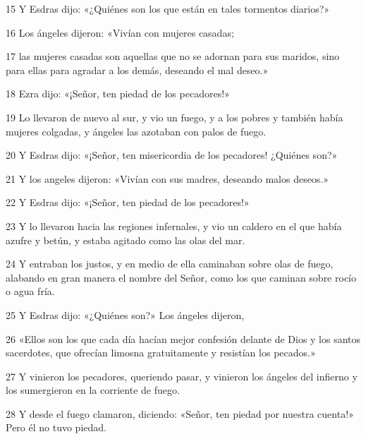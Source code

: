 \par 15 Y Esdras dijo: «¿Quiénes son los que están en tales tormentos diarios?»

\par 16 Los ángeles dijeron: «Vivían con mujeres casadas;

\par 17 las mujeres casadas son aquellas que no se adornan para sus maridos, sino para ellas para agradar a los demás, deseando el mal deseo.»

\par 18 Ezra dijo: «¡Señor, ten piedad de los pecadores!»

\par 19 Lo llevaron de nuevo al sur, y vio un fuego, y a los pobres y también había mujeres colgadas, y ángeles las azotaban con palos de fuego.

\par 20 Y Esdras dijo: «¡Señor, ten misericordia de los pecadores! ¿Quiénes son?»

\par 21 Y los angeles dijeron: «Vivían con sus madres, deseando malos deseos.»

\par 22 Y Esdras dijo: «¡Señor, ten piedad de los pecadores!»

\par 23 Y lo llevaron hacia las regiones infernales, y vio un caldero en el que había azufre y betún, y estaba agitado como las olas del mar.

\par 24 Y entraban los justos, y en medio de ella caminaban sobre olas de fuego, alabando en gran manera el nombre del Señor, como los que caminan sobre rocío o agua fría.

\par 25 Y Esdras dijo: «¿Quiénes son?» Los ángeles dijeron,

\par 26 «Ellos son los que cada día hacían mejor confesión delante de Dios y los santos sacerdotes, que ofrecían limosna gratuitamente y resistían los pecados.»

\par 27 Y vinieron los pecadores, queriendo pasar, y vinieron los ángeles del infierno y los sumergieron en la corriente de fuego.

\par 28 Y desde el fuego clamaron, diciendo: «Señor, ten piedad por nuestra cuenta!» Pero él no tuvo piedad.

